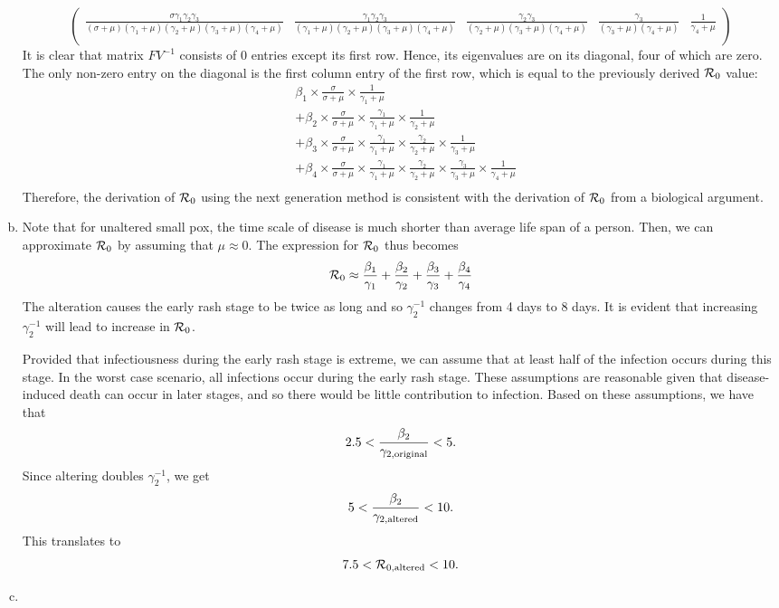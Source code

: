 \documentclass[12pt]{article}\usepackage[]{graphicx}\usepackage[]{color}
\begin{document}
\begin{enumerate}[(a)]
{{$$\begin{pmatrix}
\frac{\sigma \gamma_1 \gamma_2 \gamma_3}{(\sigma + \mu)(\gamma_1 + \mu)(\gamma_2 + \mu)(\gamma_3 + \mu)(\gamma_4  +\mu)} & \frac{\gamma_1 \gamma_2 \gamma_3}{(\gamma_1 + \mu)(\gamma_2 + \mu)(\gamma_3 + \mu)(\gamma_4  +\mu)} & \frac{\gamma_2 \gamma_3}{(\gamma_2 + \mu)(\gamma_3 + \mu)(\gamma_4  +\mu)} & \frac{\gamma_3}{(\gamma_3 + \mu)(\gamma_4  +\mu)} & \frac{1}{\gamma_4  +\mu}\\
\end{pmatrix}
$$
It is clear that matrix $FV^{-1}$ consists of 0 entries except its first row.
Hence, its eigenvalues are on its diagonal, four of which are zero. The only non-zero entry on the diagonal is the first column entry of the first row, which is equal to the previously derived ${\cal R}_0$ value:
$$
\begin{aligned}
&\beta_1 \times \frac{\sigma}{\sigma + \mu} \times \frac{1}{\gamma_1 + \mu}\\
&+ \beta_2 \times \frac{\sigma}{\sigma + \mu} \times \frac{\gamma_1}{\gamma_1 + \mu} \times \frac{1}{\gamma_2 + \mu}\\
&+ \beta_3 \times \frac{\sigma}{\sigma + \mu} \times \frac{\gamma_1}{\gamma_1 + \mu} \times \frac{\gamma_2}{\gamma_2 + \mu} \times \frac{1}{\gamma_3 + \mu}\\
&+ \beta_4 \times \frac{\sigma}{\sigma + \mu} \times \frac{\gamma_1}{\gamma_1 + \mu} \times \frac{\gamma_2}{\gamma_2 + \mu} \times \frac{\gamma_3}{\gamma_3 + \mu} \times \frac{1}{\gamma_4 + \mu}\\
\end{aligned}
$$
Therefore, the derivation of ${\cal R}_0$ using the next generation method is consistent with the derivation of ${\cal R}_0$ from a biological argument.
}}

  \item \Rd

{\color{blue} {    
Note that for unaltered small pox, the time scale of disease is much shorter than average life span of a person. Then, we can approximate ${\cal R}_0$ by assuming that $\mu \approx 0$. The expression for ${\cal R}_0$ thus becomes
$$
{\cal R}_0 \approx \frac{\beta_1}{\gamma_1} + \frac{\beta_2}{\gamma_2} + \frac{\beta_3}{\gamma_3} + \frac{\beta_4}{\gamma_4}
$$
The alteration causes the early rash stage to be twice as long and so $\gamma_2^{-1}$ changes from 4 days to 8 days.
It is evident that increasing $\gamma_2^{-1}$ will lead to increase in ${\cal R}_0$.

Provided that infectiousness during the early rash stage is extreme, we can assume that at least half of the infection occurs during this stage. In the worst case scenario, all infections occur during the early rash stage. These assumptions are reasonable given that disease-induced death can occur in later stages, and so there would be little contribution to infection.
Based on these assumptions, we have that
$$
2.5 < \frac{\beta_2}{\gamma_{2,\tiny{\textrm{original}}}} < 5.
$$
Since altering doubles $\gamma_2^{-1}$, we get
$$
5 < \frac{\beta_2}{\gamma_{2,\tiny{\textrm{altered}}}} < 10.
$$
This translates to
$$
7.5 < {\cal R}_{0, \tiny{\textrm{altered}}} <10.
$$
}}
  \item \qRe


\end{enumerate}
\end{document}
